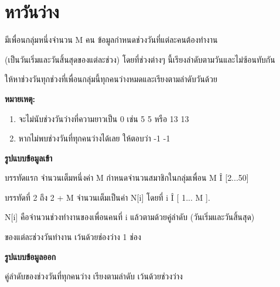\documentclass{article}
\begin{document}
\section*{หาวันว่าง}

มีเพื่อนกลุ่มหนึ่งจำนวน M คน ข้อมูลกำหนดช่วงวันที่แต่ละคนต้องทำงาน

(เป็นวันเริ่มและวันสิ้นสุดของแต่ละช่วง) โดยที่ช่วงต่างๆ นี้เรียงลำดับตามวันและไม่ซ้อนทับกัน

ให้หาช่วงวันทุกช่วงที่เพื่อนกลุ่มนี้ทุกคนว่างหมดและเรียงตามลำดับวันด้วย



\textbf{หมายเหตุ:}



\begin{enumerate}

\tightlist

\item

  จะไม่นับช่วงวันว่างที่ความยาวเป็น 0 เช่น 5 5 หรือ 13 13

\item

  หากไม่พบช่วงวันที่ทุกคนว่างได้เลย ให้ตอบว่า -1 -1

\end{enumerate}



\textbf{รูปแบบข้อมูลเข้า}



บรรทัดแรก จำนวนเต็มหนึ่งค่า M กำหนดจำนวนสมาชิกในกลุ่มเพื่อน M Î {[}2...50{]}



บรรทัดที่ 2 ถึง 2 + M จำนวนเต็มเป็นค่า N{[}i{]} โดยที่ i Î {[} 1... M {]}.

N{[}i{]} คือจำนวนช่วงทำงานของเพื่อนคนที่ i แล้วตามด้วยคู่ลำดับ (วันเริ่มและวันสิ้นสุด)

ของแต่ละช่วงวันทำงาน เว้นด้วยช่องว่าง 1 ช่อง



\textbf{รูปแบบข้อมูลออก}



คู่ลำดับของช่วงวันที่ทุกคนว่าง เรียงตามลำดับ เว้นด้วยช่วงว่าง
\end{document}
